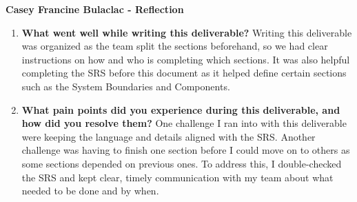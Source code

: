 \documentclass{article}
\begin{document}
\textbf{Casey Francine Bulaclac - Reflection}
\begin{enumerate}
    \item \textbf{What went well while writing this deliverable? }
    Writing this deliverable was organized as the team split the sections beforehand, so we had clear instructions on how and who is completing which sections. It 
    was also helpful completing the SRS before this document as it helped define certain sections such as the System Boundaries and Components. 

    \item \textbf{What pain points did you experience during this deliverable, and how
    did you resolve them?}
    One challenge I ran into with this deliverable were keeping the language and details aligned with the SRS. Another challenge was having to finish one section before I could move on 
    to others as some sections depended on previous ones. To address this, I double-checked the SRS and kept clear, timely communication with my team about what needed to be done and by when.
\end{enumerate}
\end{document}
